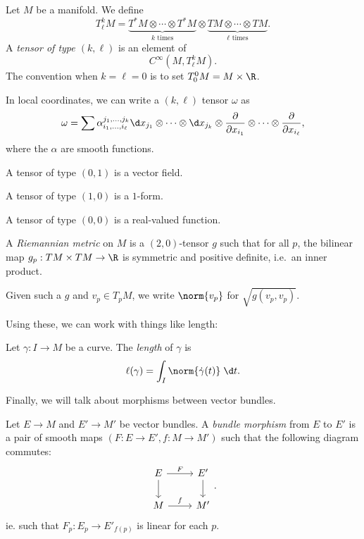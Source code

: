 \documentclass[a4paper]{article}
\begin{document}
\begin{defi}
  Let $M$ be a manifold. We define
  \[
    T_{\ell}^k M = \underbrace{T^*M \otimes \cdots \otimes T^* M}_{k \text{ times}} \otimes \underbrace{TM \otimes \cdots \otimes TM}_{\ell \text{ times}}.
  \]
  A \emph{tensor of type $(k, \ell)$} is an element of
  \[
    C^\infty (M, T_\ell^k M).
  \]
  The convention when $k = \ell = 0$ is to set $T_0^0 M = M \times \R$.
\end{defi}

In local coordinates, we can write a $(k, \ell)$ tensor $\omega$ as
\[
  \omega = \sum \alpha_{i_1, \ldots, i_\ell}^{j_1, \ldots, j_k} \d x_{j_1} \otimes \cdots \otimes \d x_{j_k} \otimes \frac{\partial}{\partial x_{i_1}} \otimes \cdots \otimes \frac{\partial}{\partial x_{i_\ell}},
\]
where the $\alpha$ are smooth functions.

\begin{eg}
  A tensor of type $(0, 1)$ is a vector field.

  A tensor of type $(1, 0)$ is a $1$-form.

  A tensor of type $(0, 0)$ is a real-valued function.
\end{eg}

\begin{defi}
  A \emph{Riemannian metric} on $M$ is a $(2, 0)$-tensor $g$ such that for all $p$, the bilinear map $g_p: T M \times T M \to \R$ is symmetric and positive definite, i.e.\ an inner product.

  Given such a $g$ and $v_p \in T_p M$, we write $\norm{v_p}$ for $\sqrt{g(v_p, v_p)}$.
\end{defi}

Using these, we can work with things like length:

\begin{defi}
  Let $\gamma: I \to M$ be a curve. The \emph{length} of $\gamma$ is
  \[
    \ell(\gamma)= \int_I \norm{\dot{\gamma}(t)} \;\d t.
  \]
\end{defi}

Finally, we will talk about morphisms between vector bundles.

\begin{defi}
  Let $E \to M$ and $E' \to M'$ be vector bundles. A \emph{bundle morphism} from $E$ to $E'$ is a pair of smooth maps $(F: E \to E', f: M \to M')$ such that the following diagram commutes:
  \[
    \begin{tikzcd}
      E \ar[d] \ar[r, "F"] & E' \ar[d]\\
      M \ar[r, "f"] & M'
    \end{tikzcd}.
  \]
  ie. such that $F_p: E_p \to E'_{f(p)}$ is linear for each $p$.
\end{defi}
\end{document}
